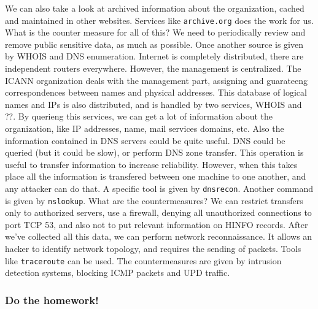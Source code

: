 We can also take a look at archived information about the 
organization, cached and maintained in other websites. 
Services like \texttt{archive.org} does the work for us. \newline
\newline What is the counter measure for all of this? We need 
to periodically review and remove public sensitive data, as 
much as possible. \newline
\newline Once another source is given by WHOIS and DNS 
enumeration. Internet is completely distributed, there are 
independent routers everywhere. However, the management
is centralized. The ICANN organization deals with the 
management part, assigning and guarateeng correspondences 
between names and physical addresses. This database of 
logical names and IPs is also distributed, and is handled
by two services, WHOIS and ??. By querieng this services, 
we can get a lot of information about the organization, like 
IP addresses, name, mail services domains, etc. \newline
\newline Also the information contained in DNS servers 
could be quite useful. DNS could be queried (but it could 
be slow), or perform DNS zone transfer. This operation is 
useful to transfer information to increase reliability. 
However, when this takes place all the information 
is transfered between one machine to one another, and any 
attacker can do that. A specific tool is given by \texttt{dnsrecon}.
Another command is given by \texttt{nslookup}. \newline
What are the countermeasures? We can restrict transfers 
only to authorized servers, use a firewall, denying all
unauthorized connections to port TCP 53, and also not to 
put relevant information on HINFO records. \newline
\newline After we've collected all this data, we can perform 
network reconnaissance. It allows an hacker to identify 
network topology, and requires the sending of packets. 
Tools like \texttt{traceroute} can be used. The countermeasures 
are given by intrusion detection systems, blocking 
ICMP packets and UPD traffic. 

\subsubsection{Do the homework!}